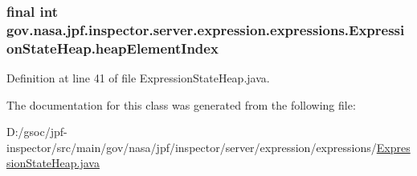 \subsubsection[{\texorpdfstring{heap\+Element\+Index}{heapElementIndex}}]{\setlength{\rightskip}{0pt plus 5cm}final int gov.\+nasa.\+jpf.\+inspector.\+server.\+expression.\+expressions.\+Expression\+State\+Heap.\+heap\+Element\+Index\hspace{0.3cm}{\ttfamily [private]}}\hypertarget{classgov_1_1nasa_1_1jpf_1_1inspector_1_1server_1_1expression_1_1expressions_1_1_expression_state_heap_afffce10742fdcd015d276f6c397a9921}{}\label{classgov_1_1nasa_1_1jpf_1_1inspector_1_1server_1_1expression_1_1expressions_1_1_expression_state_heap_afffce10742fdcd015d276f6c397a9921}


Definition at line 41 of file Expression\+State\+Heap.\+java.



The documentation for this class was generated from the following file\+:\begin{DoxyCompactItemize}
\item 
D\+:/gsoc/jpf-\/inspector/src/main/gov/nasa/jpf/inspector/server/expression/expressions/\hyperlink{_expression_state_heap_8java}{Expression\+State\+Heap.\+java}\end{DoxyCompactItemize}
